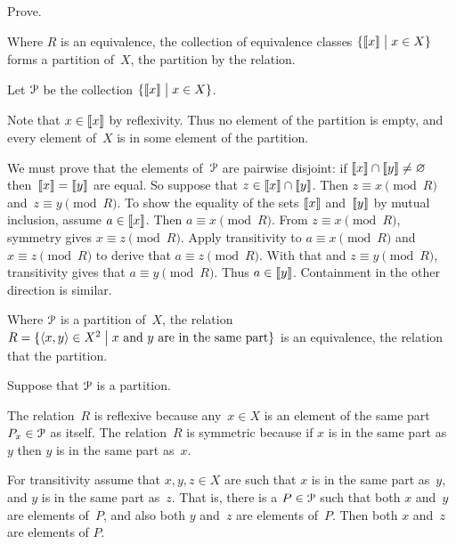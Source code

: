 \documentclass{ibl}  %
\begin{document}
\begin{problem} \label{ex:EquivClassesFormPartition}
Prove.
\begin{exes}
\begin{exercise} 
  Where $R$ is an equivalence, 
  the collection of equivalence classes 
  $\{\llbracket x \rrbracket \bigm| x\in X\}$ forms a partition of~$X$,
  the partition  by the relation.
\end{exercise}
\begin{answer}
  Let $\EuScript{P}$ be the collection $\{\llbracket x \rrbracket \bigm| x\in X\}$.
 
  Note that $x\in\llbracket x \rrbracket$ by reflexivity.
  Thus no element of the partition is empty, and 
  every element of~$X$ is in some element of the partition.

  We must prove that the elements of~$\EuScript{P}$ are pairwise disjoint:
  if $\llbracket x \rrbracket\cap\llbracket y \rrbracket\neq\varnothing$
  then~$\llbracket x \rrbracket=\llbracket y \rrbracket$ are equal.
  So suppose that $z\in\llbracket x \rrbracket\cap\llbracket y \rrbracket$.
  Then $z\equiv x\pmod R$ and~$z\equiv y\pmod R$.
  To show the equality of the sets $\llbracket x \rrbracket$ and~$\llbracket y \rrbracket$ 
  by mutual inclusion, assume $a\in\llbracket x \rrbracket$.
  Then $a\equiv x\pmod R$.
  From $z\equiv x\pmod R$, symmetry gives $x\equiv z\pmod R$.
  Apply transitivity to $a\equiv x\pmod R$ and~$x\equiv z\pmod R$ to
  derive that $a\equiv z\pmod R$.
  With that and $z\equiv y\pmod R$, transitivity gives
  that $a\equiv y\pmod R$. 
  Thus $a\in\llbracket y \rrbracket$.
  Containment in the other direction is similar.    
\end{answer}
\begin{exercise} 
  Where $\EuScript{P}$ is a partition of~$X$, 
  the relation 
  $R=\{\langle x,y\rangle\in X^2 \bigm| 
            \text{$x$ and~$y$ are in the same part}\}$ 
  is an equivalence, 
  the relation that  the partition. 
\end{exercise}
\begin{answer}
  Suppose that $\EuScript{P}$ is a partition. 

  The relation~$R$ is reflexive because any~$x\in X$ is an element of
  the same part $P_{x}\in\EuScript{P}$ as itself.
  The relation~$R$ is symmetric because if $x$ is in the same part as~$y$
  then $y$ is in the same part as~$x$.

  For transitivity assume that $x,y,z\in X$ are such that 
  $x$ is in the same part as~$y$, and 
  $y$ is in the same part as~$z$.
  That is, there is a $P\in\EuScript{P}$ such that
  both $x$ and~$y$ are elements of~$P$, 
  and also both $y$ and~$z$ are elements of~$P$.
  Then both $x$ and~$z$ are elements of $P$.  
\end{answer}
\end{exes}
\end{problem}
\end{document}

